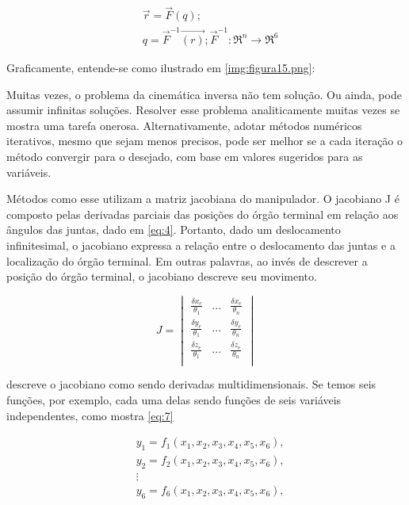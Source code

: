 \begin{align}
	&\vec{r} = \vec{F}(q); \nonumber\\
	&q = \vec{F}^{-1}\vec{(r)}; \vec{F}^{-1} :\Re^n \rightarrow \Re^6
	\label{eq:3}
\end{align}

Graficamente, entende-se como ilustrado em \ref{img:figura15.png}:


Muitas vezes, o problema da cinemática inversa não tem solução. Ou ainda, pode assumir infinitas soluções. Resolver esse problema analiticamente muitas vezes se
mostra uma tarefa onerosa. Alternativamente, adotar métodos numéricos iterativos, mesmo
que sejam menos precisos, pode ser melhor se a cada iteração o método convergir para o
desejado, com base em valores sugeridos para as variáveis.

Métodos como esse utilizam a matriz jacobiana do manipulador. O jacobiano J é
composto pelas derivadas parciais das posições do órgão terminal em relação aos ângulos
das juntas, dado em \eqref{eq:4}. Portanto, dado um deslocamento infinitesimal, o jacobiano expressa a relação entre o deslocamento das juntas e a localização do órgão terminal. Em outras palavras, ao
invés de descrever a posição do órgão terminal, o jacobiano descreve seu movimento\cite{Nilsson2009}.

\begin{equation}
J = \begin{vmatrix}
		\displaystyle
			\frac{\delta x_e}{\theta_1} & \displaystyle ...  & \displaystyle \frac{\delta x_e}{\theta_n} \\ 
		\displaystyle
			\frac{\delta y_e}{\theta_1} & \displaystyle ...  & \displaystyle \frac{\delta y_e}{\theta_n} \\ 
		\displaystyle
			\frac{\delta z_e}{\theta_1} & \displaystyle ...  & \displaystyle \frac{\delta z_e}{\theta_n} \\ 
	\end{vmatrix} 
	\label{eq:4}
\end{equation}

 descreve o jacobiano como sendo derivadas multidimensionais. Se temos seis funções, por exemplo, cada uma delas sendo funções de seis variáveis independentes, como mostra \eqref{eq:7}

\begin{align}
	&y_1 = f_1(x_1,x_2,x_3, x_4, x_5, x_6), \nonumber\\
	&y_2 = f_2(x_1,x_2,x_3, x_4, x_5, x_6), \nonumber\\
	&\vdots \nonumber\\
	&y_6 = f_6(x_1,x_2,x_3, x_4, x_5, x_6),
	\label{eq:7}
\end{align}

